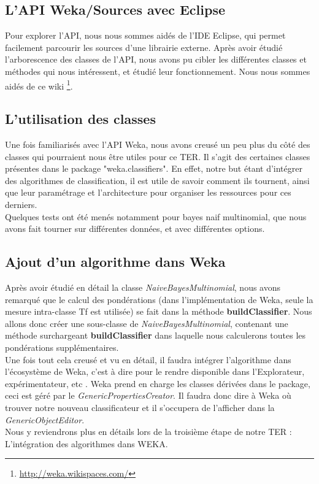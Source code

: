 \documentclass{article}
\begin{document}
\subsection{L'API Weka/Sources avec Eclipse}
Pour explorer l'API, nous nous sommes aidés de l'IDE Eclipse, qui permet facilement parcourir les sources d'une librairie externe. Après avoir étudié l'arborescence des classes de l'API, nous avons pu cibler les différentes classes et méthodes qui nous intéressent, et étudié leur fonctionnement. Nous nous sommes aidés de ce wiki \footnote{\href{http://weka.wikispaces.com/}{http://weka.wikispaces.com/}}.

\subsection{L'utilisation des classes}
Une fois familiarisés avec l'API Weka, nous avons creusé un peu plus du côté des classes qui pourraient nous être utiles pour ce TER. Il s'agit des certaines classes présentes dans le package{\scriptsize { \normalsize "weka.classifiers"}}. En effet, notre but étant d'intégrer des algorithmes de classification, il est utile de savoir comment ils tournent, ainsi que leur paramétrage et l'architecture pour organiser les ressources pour ces derniers.\\
Quelques tests ont été menés notamment pour bayes naif multinomial, que nous avons fait tourner sur différentes données, et avec différentes options.
\subsection{Ajout d'un algorithme dans Weka}\label{sec:algoW}
Après avoir étudié en détail la classe \textit{NaiveBayesMultinomial}, nous avons remarqué que le calcul des pondérations (dans l'implémentation de Weka, seule la mesure intra-classe Tf est utilisée) se fait dans la méthode \textbf{buildClassifier}. Nous allons donc créer une sous-classe de \textit{NaiveBayesMultinomial}, contenant une méthode surchargeant \textbf{buildClassifier} dans laquelle nous calculerons toutes les pondérations supplémentaires.\\
Une fois tout cela creusé et vu en détail, il faudra intégrer l'algorithme dans l'écosystème de Weka, c'est à dire pour le rendre disponible dans l'Explorateur, expérimentateur, etc . 
Weka prend en charge les classes dérivées dans le package, ceci est géré par le \textit{GenericPropertiesCreator}. Il faudra donc dire à Weka où trouver notre nouveau classificateur et il s'occupera de l'afficher dans la \textit{GenericObjectEditor}.\\
Nous y reviendrons plus en détails lors de la troisième étape de notre TER : L'intégration des algorithmes dans WEKA.
\end{document}
